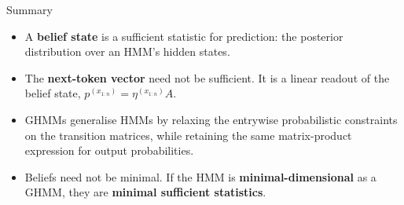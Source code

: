 \documentclass[aspectratio=169,12pt,t]{beamer}
\begin{document}
\begin{frame}{Summary}
  \setlength{\parskip}{0pt}
  \vfill
  \begin{itemize}
    \setlength{\itemsep}{4mm}
    \item A \textbf{belief state} is a sufficient statistic for prediction:
      the posterior distribution over an HMM's hidden states.
    \item The \textbf{next-token vector} need not be sufficient. It is a
      linear readout of the belief state,
      $p^{(x_{1:n})}=\eta^{(x_{1:n})}A$.
    \item GHMMs generalise HMMs by relaxing the entrywise probabilistic
      constraints on the transition matrices, while retaining the same
      matrix-product expression for output probabilities.
    \item Beliefs need not be minimal. If the HMM is
      \textbf{minimal-dimensional} as a GHMM, they are \textbf{minimal sufficient
      statistics}.
  \end{itemize}

  \vfill

\end{frame}
\end{document}
